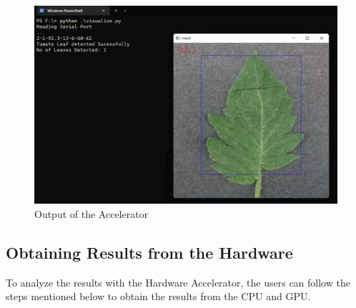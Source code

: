 \documentclass[a4paper,12pt,oneside]{book}
\begin{document}
\begin{enumerate}
        \begin{figure}[h!]
            \centering
            \includegraphics[scale=0.2]{images/output.png}
            \caption{Output of the Accelerator}
            \label{figure:output-fpga}
        \end{figure}
\end{enumerate}

\subsection*{Obtaining Results from the Hardware}
To analyze the results with the Hardware Accelerator, the users can follow the steps mentioned below to obtain the results from the CPU and GPU.\\
\end{document}
